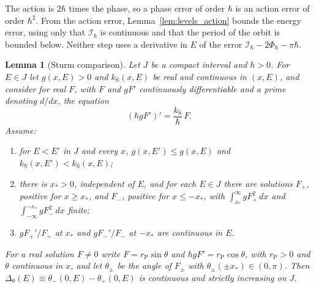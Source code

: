 \documentclass[aps,prd,onecolumn,tightenlines,nofootinbib,notitlepage,11pt,floatfix]{revtex4-2}
\theoremstyle{indentedtheorem}
\newtheorem{lemma}{Lemma}
\begin{document}
\noindent The action is $2\hbar$ times the phase, so a phase error of order $\hbar$ is an action error of order $\hbar^2$. From the action error, Lemma~\ref{lem:levels_action} bounds the energy error, using only that $\mathcal{I}_\hbar$ is continuous and that the period of the orbit is bounded below. Neither step uses a derivative in $E$ of the error $\mathcal{I}_\hbar-2\Phi_\hbar-\pi\hbar$.


\begin{lemma}[Sturm comparison]\label{lem:sturm}
Let $J$ be a compact interval and $\hbar>0$. For $E\in J$ let $g(x,E)>0$ and $k_\text{S}(x,E)$ be real and continuous in $(x,E)$, and consider for real $F$, with $F$ and $gF'$ continuously differentiable and a prime denoting $d/dx$, the equation
\begin{equation*}
    (\hbar gF')' = \frac{k_\text{S}}{\hbar}\,F .
\end{equation*}
Assume:
\begin{enumerate}
\item[(S1)] for $E<E'$ in $J$ and every $x$, $g(x,E')\leq g(x,E)$ and $k_\text{S}(x,E')<k_\text{S}(x,E)$;
\item[(S2)] there is $x_*>0$, independent of $E$, and for each $E\in J$ there are solutions $F_+$, positive for $x\geq x_*$, and $F_-$, positive for $x\leq-x_*$, with $\int_{x_*}^\infty gF_+^2\,dx$ and $\int_{-\infty}^{-x_*}gF_-^2\,dx$ finite;
\item[(S3)] $gF_+'/F_+$ at $x_*$ and $gF_-'/F_-$ at $-x_*$ are continuous in $E$.
\end{enumerate}
For a real solution $F\neq0$ write $F=r_\text{P}\sin\theta$ and $\hbar gF'=r_\text{P}\cos\theta$, with $r_\text{P}>0$ and $\theta$ continuous in $x$, and let $\theta_\pm$ be the angle of $F_\pm$ with $\theta_\pm(\pm x_*)\in(0,\pi)$. Then $\Delta_\theta(E)\equiv\theta_-(0,E)-\theta_+(0,E)$ is continuous and strictly increasing on $J$.
\end{lemma}
\end{document}
